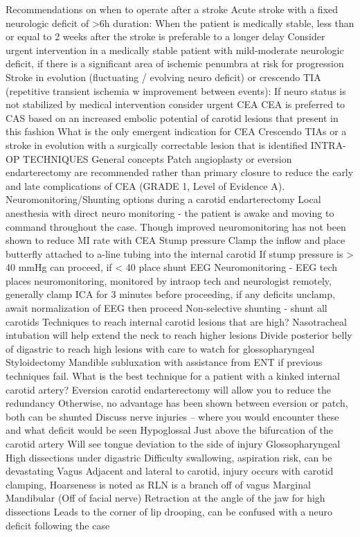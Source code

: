 \documentclass[
]{book}
\theoremstyle{definition}
\theoremstyle{definition}
\theoremstyle{definition}
\theoremstyle{definition}
\theoremstyle{remark}
\begin{document}
Recommendations on when to operate after a stroke Acute stroke with a
fixed neurologic deficit of \textgreater6h duration: When the patient is medically
stable, less than or equal to 2 weeks after the stroke is preferable to
a longer delay Consider urgent intervention in a medically stable
patient with mild-moderate neurologic deficit, if there is a significant
area of ischemic penumbra at risk for progression\\
Stroke in evolution (fluctuating / evolving neuro deficit) or crescendo
TIA (repetitive transient ischemia w improvement between events): If
neuro status is not stabilized by medical intervention consider urgent
CEA CEA is preferred to CAS based on an increased embolic potential of
carotid lesions that present in this fashion What is the only emergent
indication for CEA Crescendo TIAs or a stroke in evolution with a
surgically correctable lesion that is identified INTRA-OP TECHNIQUES
General concepts Patch angioplasty or eversion endarterectomy are
recommended rather than primary closure to reduce the early and late
complications of CEA (GRADE 1, Level of Evidence A).
Neuromonitoring/Shunting options during a carotid endarterectomy Local
anesthesia with direct neuro monitoring - the patient is awake and
moving to command throughout the case. Though improved neuromonitoring
has not been shown to reduce MI rate with CEA Stump pressure Clamp the
inflow and place butterfly attached to a-line tubing into the internal
carotid If stump pressure is \textgreater{} 40 mmHg can proceed, if \textless{} 40 place
shunt EEG Neuromonitoring - EEG tech places neuromonitoring, monitored
by intraop tech and neurologist remotely, generally clamp ICA for 3
minutes before proceeding, if any deficits unclamp, await normalization
of EEG then proceed Non-selective shunting - shunt all carotids
Techniques to reach internal carotid lesions that are high? Nasotracheal
intubation will help extend the neck to reach higher lesions Divide
posterior belly of digastric to reach high lesions with care to watch
for glossopharyngeal Styloidectomy Mandible subluxation with assistance
from ENT if previous techniques fail. What is the best technique for a
patient with a kinked internal carotid artery? Eversion carotid
endarterectomy will allow you to reduce the redundancy Otherwise, no
advantage has been shown between eversion or patch, both can be shunted
Discuss nerve injuries -- where you would encounter these and what
deficit would be seen Hypoglossal Just above the bifurcation of the
carotid artery Will see tongue deviation to the side of injury
Glossopharyngeal High dissections under digastric Difficulty swallowing,
aspiration risk, can be devastating Vagus Adjacent and lateral to
carotid, injury occurs with carotid clamping, Hoarseness is noted as RLN
is a branch off of vagus Marginal Mandibular (Off of facial nerve)
Retraction at the angle of the jaw for high dissections Leads to the
corner of lip drooping, can be confused with a neuro deficit following
the case
\end{document}
